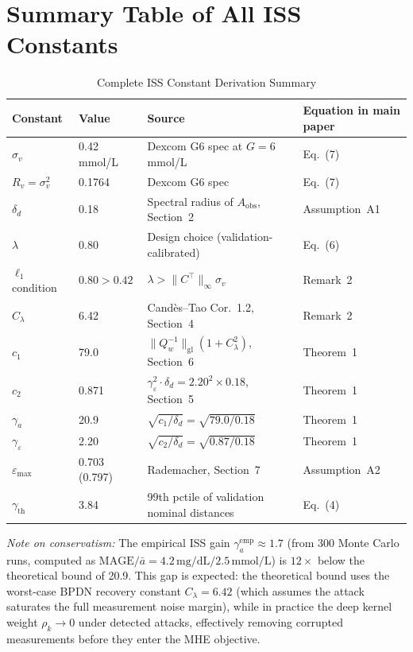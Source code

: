 \documentclass[11pt,a4paper]{article}
\begin{document}
\section{Summary Table of All ISS Constants}

\begin{table}[h!]
\centering
\caption{Complete ISS Constant Derivation Summary}
\begin{tabular}{llll}
\toprule
Constant & Value & Source & Equation in main paper\\
\midrule
$\sigma_v$          & 0.42\,mmol/L  & Dexcom G6 spec at $G=6$\,mmol/L & Eq.~(7)\\
$R_v = \sigma_v^2$  & 0.1764        & Dexcom G6 spec & Eq.~(7)\\
$\delta_d$          & 0.18          & Spectral radius of $A_\mathrm{obs}$, Section~2 & Assumption~A1\\
$\lambda$           & 0.80          & Design choice (validation-calibrated) & Eq.~(6)\\
$\ell_1$ condition  & $0.80 > 0.42$ & $\lambda > \|C^\top\|_\infty\sigma_v$ & Remark~2\\
$C_\lambda$         & 6.42          & Candès--Tao Cor.~1.2, Section~4 & Remark~2\\
$c_1$               & 79.0          & $\|Q_w^{-1}\|_\mathrm{gl}(1+C_\lambda^2)$, Section~6 & Theorem~1\\
$c_2$               & 0.871         & $\gamma_\varepsilon^2\cdot\delta_d = 2.20^2\times0.18$, Section~5 & Theorem~1\\
$\gamma_a$          & 20.9          & $\sqrt{c_1/\delta_d} = \sqrt{79.0/0.18}$ & Theorem~1\\
$\gamma_\varepsilon$& 2.20          & $\sqrt{c_2/\delta_d} = \sqrt{0.87/0.18}$ & Theorem~1\\
$\varepsilon_\mathrm{max}$ & 0.703 (0.797) & Rademacher, Section~7 & Assumption~A2\\
$\gamma_\mathrm{th}$& 3.84          & 99th pctile of validation nominal distances & Eq.~(4)\\
\bottomrule
\end{tabular}
\end{table}

\noindent\textit{Note on conservatism:} The empirical ISS gain
$\gamma_a^\mathrm{emp} \approx 1.7$ (from 300 Monte Carlo runs, computed as
$\mathrm{MAGE}/\bar{a} = 4.2\,\mathrm{mg/dL} / 2.5\,\mathrm{mmol/L}$) is
$12\times$ below the theoretical bound of 20.9. This gap is expected: the
theoretical bound uses the worst-case BPDN recovery constant $C_\lambda = 6.42$
(which assumes the attack saturates the full measurement noise margin), while in
practice the deep kernel weight $\rho_k \to 0$ under detected attacks, effectively
removing corrupted measurements before they enter the MHE objective.
\end{document}

